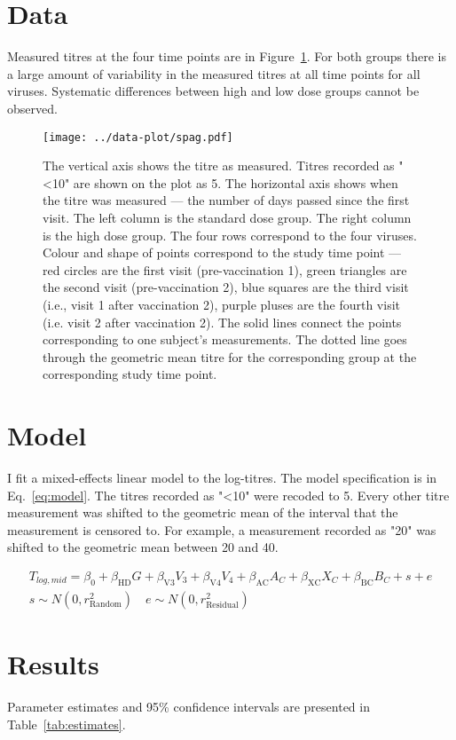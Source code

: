 \documentclass[11pt]{article}
\begin{document}
\section{Data}

Measured titres at the four time points are in Figure~\ref{fig:spag}.
For both groups there is a large amount of variability in the measured titres
at all time points for all viruses. Systematic differences between high and
low dose groups cannot be observed.

\begin{figure}[htp]
    \centering
    \texttt{[image: ../data-plot/spag.pdf]}
    \caption{
        The vertical axis shows the titre as measured.
        Titres recorded as "<10" are shown on the plot as 5.
        The horizontal axis shows when the titre was measured --- the number of
        days passed since the first visit.
        The left column is the standard dose group.
        The right column is the high dose group.
        The four rows correspond to the four viruses.
        Colour and shape of points correspond to the study time point ---
        red circles are the first visit (pre-vaccination 1),
        green triangles are the second visit (pre-vaccination 2),
        blue squares are the third visit (i.e., visit 1 after vaccination 2),
        purple pluses are the fourth visit (i.e. visit 2 after vaccination 2).
        The solid lines connect the points
        corresponding to one subject's measurements.
        The dotted line goes through the geometric mean titre for the
        corresponding group at the corresponding study time point.
    }
    \label{fig:spag}
\end{figure}

\section{Model}

I fit a mixed-effects linear model to the log-titres.
The model specification is in Eq.~\ref{eq:model}.
The titres recorded as "<10" were recoded to 5. Every other titre measurement
was shifted to the geometric mean of the interval that the measurement
is censored to. For example, a measurement recorded as "20" was shifted to the
geometric mean between 20 and 40.

\begin{gather}
    \label{eq:model}
    T_{log,mid} = \beta_0 + \beta_{\text{HD}}G + \beta_{\text{V3}}V_3
    + \beta_{\text{V4}}V_4 + \beta_{\text{AC}}A_C
    + \beta_{\text{XC}}X_C + \beta_{\text{BC}}B_C
    + s + e\\
    s \sim N(0, r^2_{\text{Random}}) \quad e \sim N(0, r^2_{\text{Residual}})
\end{gather}

\section{Results}

Parameter estimates and 95\% confidence intervals
are presented in Table~\ref{tab:estimates}.


\end{document}
